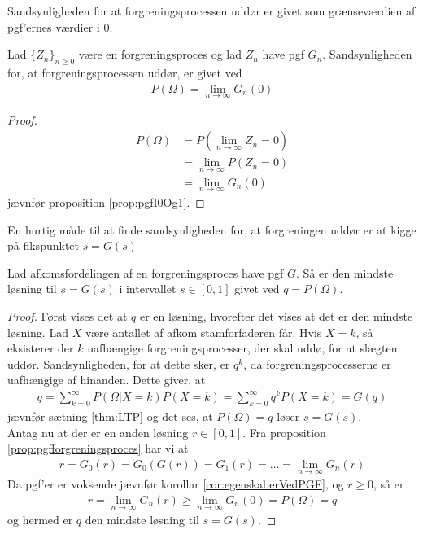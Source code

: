 Sandsynligheden for at forgreningsprocessen uddør er givet som grænseværdien af pgf'ernes værdier i $0$.
\begin{prop}
Lad $\{Z_n\}_{n \geq 0}$ være en forgreningsproces og lad $Z_n$ have pgf $G_n$. Sandsynligheden for, at forgreningsprocessen uddør, er givet ved
\begin{align*}
    P(\Omega)=\lim_{n\rightarrow\infty}G_n(0)
\end{align*}
\end{prop}
\begin{proof}
\begin{align*}
    P(\Omega)&=P\left(\lim_{n\rightarrow\infty}Z_n = 0\right)\\
    &=\lim_{n\rightarrow\infty}P(Z_n = 0)\\
    &=\lim_{n\rightarrow\infty}G_n(0)
\end{align*}
jævnfør proposition \ref{prop:pgfI0Og1}.
\end{proof}

En hurtig måde til at finde sandsynligheden for, at forgreningen uddør er at kigge på fikspunktet $s=G(s)$  
\begin{prop} \label{prop:prop8.7}%
Lad afkomsfordelingen af en forgreningsproces have pgf $G$. Så er den mindste løsning til $s=G(s)$ i intervallet $s\in[0,1]$ givet ved $q=P(\Omega)$.
\end{prop}
\begin{proof}
Først vises det at $q$ er en løsning, hvorefter det vises at det er den mindste løsning.
Lad $X$ være antallet af afkom stamforfaderen får.
Hvis $X=k$, så eksisterer der $k$ uafhængige forgreningsprocesser, der skal uddø, for at slægten uddør.
Sandsynligheden, for at dette sker, er $q^k$, da forgreningsprocesserne er uafhængige af hinanden.
Dette giver, at 
\begin{align*}
    q=\sum_{k=0}^{\infty}P(\Omega|X=k)P(X=k)=\sum_{k=0}^{\infty}q^kP(X=k)=G(q)
\end{align*}
jævnfør sætning \ref{thm:LTP} og det ses, at $P(\Omega)=q$ løser $s=G(s)$.\\ 
Antag nu at der er en anden løsning $r\in[0,1]$.
Fra proposition \ref{prop:pgfforgreningsproces} har vi at
\begin{align*}
    r=G_0(r)=G_0(G(r))=G_1(r)=\dots=\lim_{n\to\infty}G_n(r)
\end{align*}
Da pgf'er er voksende jævnfør korollar \ref{cor:egenskaberVedPGF}, og $r\geq 0$, så er
\begin{align*}
    r = \lim_{n\to\infty}G_n(r) \geq \lim_{n\to\infty}G_n(0)=P(\Omega)=q
\end{align*}
og hermed er $q$ den mindste løsning til $s=G(s)$.
\end{proof}

